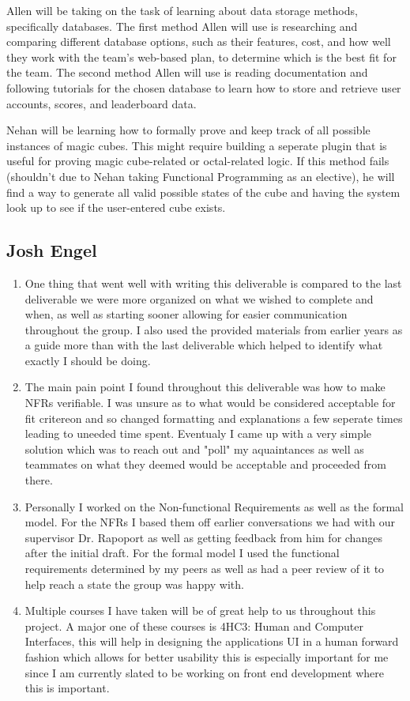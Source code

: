 \documentclass[12pt]{article}
\begin{document}
\begin{enumerate}
  Allen will be taking on the task of learning about data storage methods, specifically databases. The first method Allen will use is researching and comparing different database options, such as their features, cost, and how well they work with the team's web-based plan, to determine which is the best fit for the team. The second method Allen will use is reading documentation and following tutorials for the chosen database to learn how to store and retrieve user accounts, scores, and leaderboard data.

  Nehan will be learning how to formally prove and keep track of all possible instances of magic cubes. This might require building a seperate plugin that is useful for proving magic cube-related or octal-related logic. If this method fails (shouldn't due to Nehan taking Functional Programming as an elective), he will find a way to generate all valid possible states of the cube and having the system look up to see if the user-entered cube exists.
\end{enumerate}

\subsection*{Josh Engel}

\begin{enumerate}
  \item One thing that went well with writing this deliverable is compared to the last
  deliverable we were more organized on what we wished to complete and when, as well as 
  starting sooner allowing for easier communication throughout the group. I also used the
  provided materials from earlier years as a guide more than with the last deliverable which
  helped to identify what exactly I should be doing. 
  \item The main pain point I found throughout this deliverable was how to make NFRs verifiable. I was unsure
  as to what would be considered acceptable for fit critereon and so changed formatting and explanations a few
  seperate times leading to uneeded time spent. Eventualy I came up with a very simple solution which was to reach
  out and "poll" my aquaintances as well as teammates on what they deemed would be acceptable and proceeded from there.
  \item Personally I worked on the Non-functional Requirements as well as the formal model. For the NFRs
  I based them off earlier conversations we had with our supervisor Dr. Rapoport as well as getting feedback from
  him for changes after the initial draft. For the formal model I used the functional requirements determined by my peers
  as well as had a peer review of it to help reach a state the group was happy with.
  \item Multiple courses I have taken will be of great help to us throughout this project.
  A major one of these courses is 4HC3: Human and Computer Interfaces, this will help in designing
  the applications UI in a human forward fashion which allows for better usability this is especially 
  important for me since I am currently slated to be working on front end development where this is important.
\end{enumerate}
\end{document}
